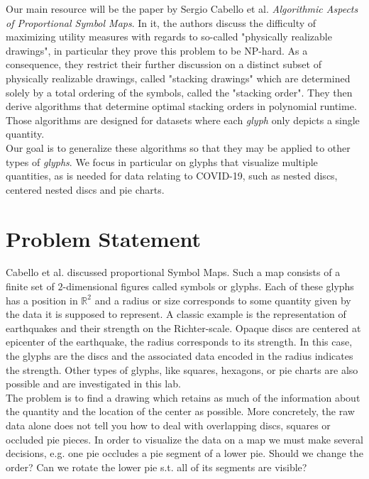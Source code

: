 \documentclass[a4paper,11pt]{article}
\begin{document}
Our main resource will be the paper by Sergio Cabello et al. \textit{Algorithmic Aspects of Proportional Symbol Maps}. In it, the authors discuss the difficulty of maximizing utility measures with regards to so-called "physically realizable drawings", in particular they prove this problem to be NP-hard. As a consequence, they restrict their further discussion on a distinct subset of physically realizable drawings, called "stacking drawings" which are determined solely by a total ordering of the symbols, called the "stacking order". They then derive algorithms that determine optimal stacking orders in polynomial runtime. Those algorithms are designed for datasets where each \textit{glyph} only depicts a single quantity.\\

Our goal is to generalize these algorithms so that they may be applied to other types of \textit{glyphs}. We focus in particular on glyphs that visualize multiple quantities, as is needed for data relating to COVID-19, such as nested discs, centered nested discs and pie charts.

\newpage

\section{Problem Statement}
Cabello et al. discussed proportional Symbol Maps. Such a map consists of a finite set of $2$-dimensional figures called symbols or glyphs. Each of these glyphs has a position in $\mathbb{R}^2$ and a radius or size corresponds to some quantity given by the data it is supposed to represent. A classic example is the representation of earthquakes and their strength on the Richter-scale. Opaque discs are centered at epicenter of the earthquake, the radius corresponds to its strength. In this case, the glyphs are the discs and the associated data encoded in the radius indicates the strength. Other types of glyphs, like squares, hexagons, or pie charts are also possible and are investigated in this lab.\\

The problem is to find a drawing which retains as much of the information about the quantity and the location of the center as possible. More concretely, the raw data alone does not tell you how to deal with overlapping discs, squares or occluded pie pieces. In order to visualize the data on a map we must make several decisions, e.g. one pie occludes a pie segment of a lower pie. Should we change the order? Can we rotate the lower pie s.t. all of its segments are visible?\\
\end{document}
